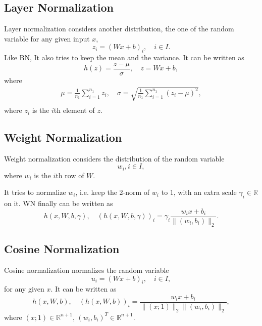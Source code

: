 \subsection{Layer Normalization}
Layer normalization considers another distribution, the one of the random variable for any given input $x$,
\begin{equation}
z_i=(Wx+b)_i,\quad i\in I.
\end{equation}
Like BN, It also tries to keep the mean and the variance. It can be written as
\begin{equation}
h(z)=\frac{z-\mu}{\sigma},\quad z=Wx+b,
\end{equation}
where
\begin{equation}
\begin{aligned}
\mu=\frac{1}{n_1}\sum_{i=1}^{n_1}z_i,\quad \sigma=\sqrt{\frac{1}{n_1}\sum_{i=1}^{n_1}(z_i-\mu)^2},\\
\end{aligned}
\end{equation}
where $z_i$ is the $i$th element of $z$.

\subsection{Weight Normalization}
Weight normalization considers the distribution of the random variable
\begin{equation}
w_i, i\in I,
\end{equation}
where $w_i$ is the $i$th row of $W$. 

It tries to normalize $w_i$, i.e. keep the 2-norm of $w_i$ to $1$, with an extra scale $\gamma_i\in\mathbb{R}$ on it. WN finally can be written as
\begin{equation}
h(x,W,b,\gamma),\quad(h(x,W,b,\gamma))_i=\gamma_i\frac{w_ix+b_i}{\|(w_i,b_i)\|_2}.
\end{equation}

\subsection{Cosine Normalization}
Cosine normalization normalizes the random variable 
\begin{equation}
u_i=(Wx+b)_i,\quad i\in I,
\end{equation}
for any given $x$. It can be written as
\begin{equation}
h(x,W,b),\quad (h(x,W,b))_i=\frac{w_ix+b_i}{\|(x;1)\|_2\|(w_i,b_i)\|_2},
\end{equation}
where $(x;1)\in\mathbb{R}^{n+1}$, $(w_i,b_i)^T\in\mathbb{R}^{n+1}$.

